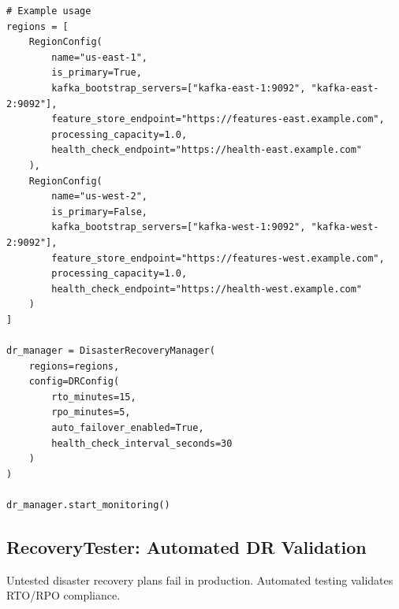 \begin{lstlisting}[style=python, caption={Disaster Recovery Manager}]
# Example usage
regions = [
    RegionConfig(
        name="us-east-1",
        is_primary=True,
        kafka_bootstrap_servers=["kafka-east-1:9092", "kafka-east-2:9092"],
        feature_store_endpoint="https://features-east.example.com",
        processing_capacity=1.0,
        health_check_endpoint="https://health-east.example.com"
    ),
    RegionConfig(
        name="us-west-2",
        is_primary=False,
        kafka_bootstrap_servers=["kafka-west-1:9092", "kafka-west-2:9092"],
        feature_store_endpoint="https://features-west.example.com",
        processing_capacity=1.0,
        health_check_endpoint="https://health-west.example.com"
    )
]

dr_manager = DisasterRecoveryManager(
    regions=regions,
    config=DRConfig(
        rto_minutes=15,
        rpo_minutes=5,
        auto_failover_enabled=True,
        health_check_interval_seconds=30
    )
)

dr_manager.start_monitoring()
\end{lstlisting}

\subsection{RecoveryTester: Automated DR Validation}

Untested disaster recovery plans fail in production. Automated testing validates RTO/RPO compliance.

